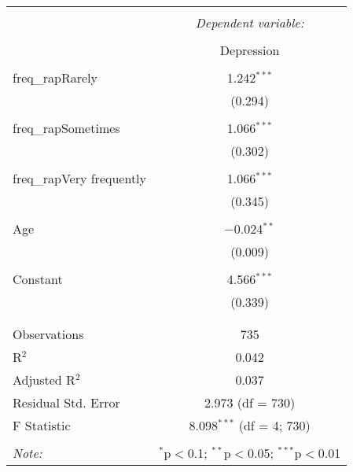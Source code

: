 \documentclass{article}
\begin{document}
\begin{table}[!htbp] \centering 
  \caption{} 
  \label{} 
\begin{tabular}{@{\extracolsep{5pt}}lc} 
\\[-1.8ex]\hline 
\hline \\[-1.8ex] 
 & \multicolumn{1}{c}{\textit{Dependent variable:}} \\ 
\cline{2-2} 
\\[-1.8ex] & Depression \\ 
\hline \\[-1.8ex] 
 freq\_rapRarely & 1.242$^{***}$ \\ 
  & (0.294) \\ 
  & \\ 
 freq\_rapSometimes & 1.066$^{***}$ \\ 
  & (0.302) \\ 
  & \\ 
 freq\_rapVery frequently & 1.066$^{***}$ \\ 
  & (0.345) \\ 
  & \\ 
 Age & $-$0.024$^{**}$ \\ 
  & (0.009) \\ 
  & \\ 
 Constant & 4.566$^{***}$ \\ 
  & (0.339) \\ 
  & \\ 
\hline \\[-1.8ex] 
Observations & 735 \\ 
R$^{2}$ & 0.042 \\ 
Adjusted R$^{2}$ & 0.037 \\ 
Residual Std. Error & 2.973 (df = 730) \\ 
F Statistic & 8.098$^{***}$ (df = 4; 730) \\ 
\hline 
\hline \\[-1.8ex] 
\textit{Note:}  & \multicolumn{1}{r}{$^{*}$p$<$0.1; $^{**}$p$<$0.05; $^{***}$p$<$0.01} \\ 
\end{tabular} 
\end{table} 
\end{document}
